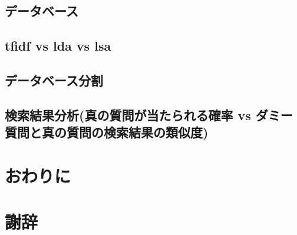 \documentclass[master]{suribt}
\theoremstyle{definition}
\begin{document}
 \section{データベース}
 \section{tfidf vs lda vs lsa}
 \section{データベース分割}

 \section{検索結果分析(真の質問が当たられる確率 vs ダミー質問と真の質問の検索結果の類似度)}
 \chapter{おわりに}

 \backmatter%
 \chapter{謝辞}%


  \appendix%
  \chapter{}
  
\end{document}
